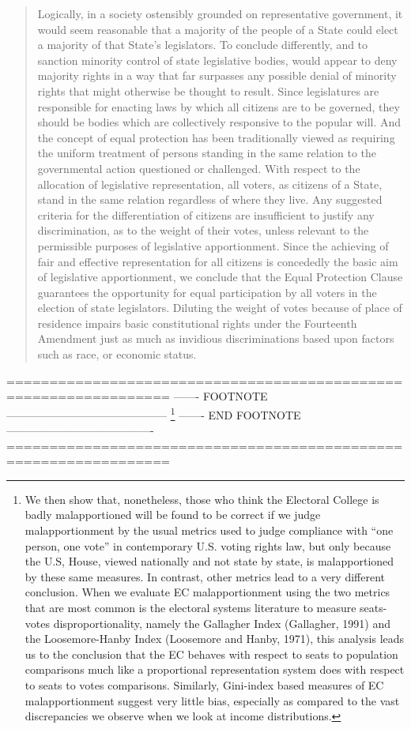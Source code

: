 {\begin{quote}
            Logically, in a society ostensibly grounded on representative government, it would seem reasonable that a majority of the people of a State could elect a majority of that State's legislators. To conclude differently, and to sanction minority control of state legislative bodies, would appear to deny majority rights in a way that far surpasses any possible denial of minority rights that might otherwise be thought to result. Since legislatures are responsible for enacting laws by which all citizens are to be governed, they should be bodies which are collectively responsive to the popular will. And the concept of equal protection has been traditionally viewed as requiring the uniform treatment of persons standing in the same relation to the governmental action questioned or challenged. With respect to the allocation of legislative representation, all voters, as citizens of a State, stand in the same relation regardless of where they live. Any suggested criteria for the differentiation of citizens are insufficient to justify any discrimination, as to the weight of their votes, unless relevant to the permissible purposes of legislative apportionment. Since the achieving of fair and effective representation for all citizens is concededly the basic aim of legislative apportionment, we conclude that the Equal Protection Clause guarantees the opportunity for equal participation by all voters in the election of state legislators. Diluting the weight of votes because of place of residence impairs basic constitutional rights under the Fourteenth Amendment just as much as invidious discriminations based upon factors such as race, or economic status.
        \end{quote}}


    =================================================================
        ------- FOOTNOTE --------------------------------------------
         \footnote{We then show that, nonetheless, those who think the Electoral College is badly malapportioned will be found to be correct if we judge malapportionment by the usual metrics used to judge compliance with “one person, one vote” in contemporary U.S. voting rights law, but only because the U.S, House, viewed nationally and not state by state, is malapportioned by these same measures. In contrast, other metrics lead to a very different conclusion. When we evaluate EC malapportionment using the two metrics that are most common is the electoral systems literature to measure seats-votes disproportionality, namely the Gallagher Index (Gallagher, 1991) and the Loosemore-Hanby Index (Loosemore and Hanby, 1971), this analysis leads us to the conclusion that the EC behaves with respect to seats to population comparisons much like a proportional representation system does with respect to seats to votes comparisons. Similarly, Gini-index based measures of EC malapportionment suggest very little bias, especially as compared to the vast discrepancies we observe when we look at income distributions.}
        ------- END FOOTNOTE ----------------------------------------
    =================================================================
    

